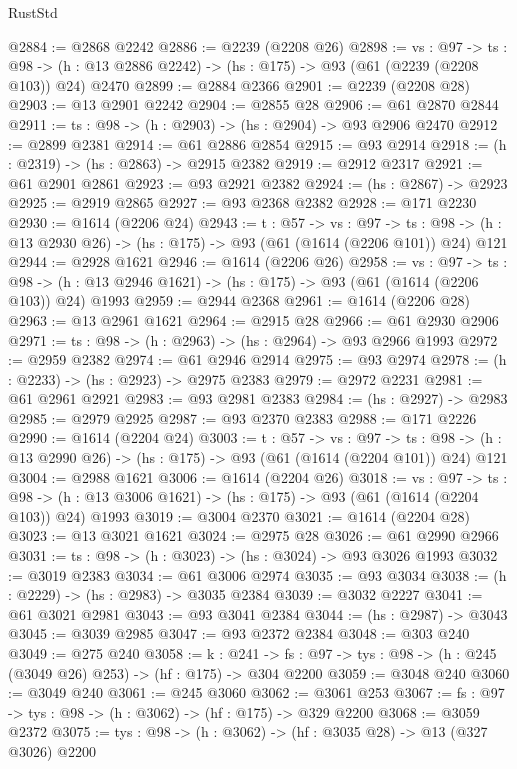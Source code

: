 \begin{lexlean}{RustStd}
\begin{coremodule}
@2884 := @2868 @2242
@2886 := @2239 (@2208 @26)
@2898 := {vs : @97} ->
  {ts : @98} -> (h : @13 @2886 @2242) -> (hs : @175) -> @93 (@61 (@2239 (@2208 @103)) @24) @2470
@2899 := @2884 @2366
@2901 := @2239 (@2208 @28)
@2903 := @13 @2901 @2242
@2904 := @2855 @28
@2906 := @61 @2870 @2844
@2911 := {ts : @98} -> (h : @2903) -> (hs : @2904) -> @93 @2906 @2470
@2912 := @2899 @2381
@2914 := @61 @2886 @2854
@2915 := @93 @2914
@2918 := (h : @2319) -> (hs : @2863) -> @2915 @2382
@2919 := @2912 @2317
@2921 := @61 @2901 @2861
@2923 := @93 @2921 @2382
@2924 := (hs : @2867) -> @2923
@2925 := @2919 @2865
@2927 := @93 @2368 @2382
@2928 := @171 @2230
@2930 := @1614 (@2206 @24)
@2943 := {t : @57} ->
  {vs : @97} ->
  {ts : @98} -> (h : @13 @2930 @26) -> (hs : @175) -> @93 (@61 (@1614 (@2206 @101)) @24) @121
@2944 := @2928 @1621
@2946 := @1614 (@2206 @26)
@2958 := {vs : @97} ->
  {ts : @98} -> (h : @13 @2946 @1621) -> (hs : @175) -> @93 (@61 (@1614 (@2206 @103)) @24) @1993
@2959 := @2944 @2368
@2961 := @1614 (@2206 @28)
@2963 := @13 @2961 @1621
@2964 := @2915 @28
@2966 := @61 @2930 @2906
@2971 := {ts : @98} -> (h : @2963) -> (hs : @2964) -> @93 @2966 @1993
@2972 := @2959 @2382
@2974 := @61 @2946 @2914
@2975 := @93 @2974
@2978 := (h : @2233) -> (hs : @2923) -> @2975 @2383
@2979 := @2972 @2231
@2981 := @61 @2961 @2921
@2983 := @93 @2981 @2383
@2984 := (hs : @2927) -> @2983
@2985 := @2979 @2925
@2987 := @93 @2370 @2383
@2988 := @171 @2226
@2990 := @1614 (@2204 @24)
@3003 := {t : @57} ->
  {vs : @97} ->
  {ts : @98} -> (h : @13 @2990 @26) -> (hs : @175) -> @93 (@61 (@1614 (@2204 @101)) @24) @121
@3004 := @2988 @1621
@3006 := @1614 (@2204 @26)
@3018 := {vs : @97} ->
  {ts : @98} -> (h : @13 @3006 @1621) -> (hs : @175) -> @93 (@61 (@1614 (@2204 @103)) @24) @1993
@3019 := @3004 @2370
@3021 := @1614 (@2204 @28)
@3023 := @13 @3021 @1621
@3024 := @2975 @28
@3026 := @61 @2990 @2966
@3031 := {ts : @98} -> (h : @3023) -> (hs : @3024) -> @93 @3026 @1993
@3032 := @3019 @2383
@3034 := @61 @3006 @2974
@3035 := @93 @3034
@3038 := (h : @2229) -> (hs : @2983) -> @3035 @2384
@3039 := @3032 @2227
@3041 := @61 @3021 @2981
@3043 := @93 @3041 @2384
@3044 := (hs : @2987) -> @3043
@3045 := @3039 @2985
@3047 := @93 @2372 @2384
@3048 := @303 @240
@3049 := @275 @240
@3058 := {k : @241} ->
  {fs : @97} -> {tys : @98} -> (h : @245 (@3049 @26) @253) -> (hf : @175) -> @304 @2200
@3059 := @3048 @240
@3060 := @3049 @240
@3061 := @245 @3060
@3062 := @3061 @253
@3067 := {fs : @97} -> {tys : @98} -> (h : @3062) -> (hf : @175) -> @329 @2200
@3068 := @3059 @2372
@3075 := {tys : @98} -> (h : @3062) -> (hf : @3035 @28) -> @13 (@327 @3026) @2200

\end{coremodule}
\end{lexlean}
